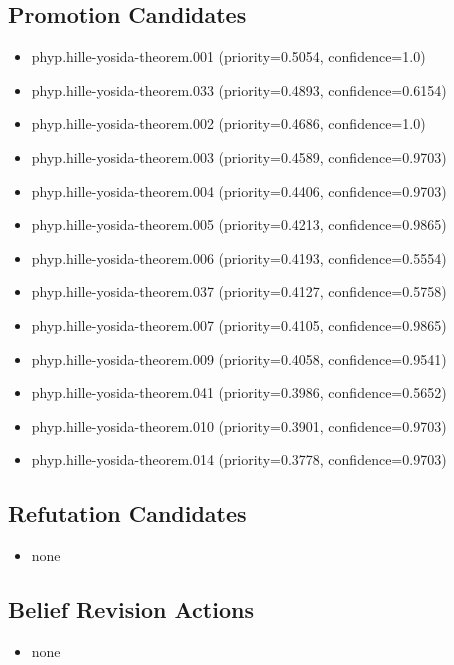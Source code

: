 \documentclass[
]{article}
\newcounter{none} %
\providecommand{\tightlist}{%
  \setlength{\itemsep}{0pt}\setlength{\parskip}{0pt}}
\begin{document}
\subsection{Promotion Candidates}\label{promotion-candidates}

\begin{itemize}
\tightlist
\item
  phyp.hille-yosida-theorem.001 (priority=0.5054, confidence=1.0)
\item
  phyp.hille-yosida-theorem.033 (priority=0.4893, confidence=0.6154)
\item
  phyp.hille-yosida-theorem.002 (priority=0.4686, confidence=1.0)
\item
  phyp.hille-yosida-theorem.003 (priority=0.4589, confidence=0.9703)
\item
  phyp.hille-yosida-theorem.004 (priority=0.4406, confidence=0.9703)
\item
  phyp.hille-yosida-theorem.005 (priority=0.4213, confidence=0.9865)
\item
  phyp.hille-yosida-theorem.006 (priority=0.4193, confidence=0.5554)
\item
  phyp.hille-yosida-theorem.037 (priority=0.4127, confidence=0.5758)
\item
  phyp.hille-yosida-theorem.007 (priority=0.4105, confidence=0.9865)
\item
  phyp.hille-yosida-theorem.009 (priority=0.4058, confidence=0.9541)
\item
  phyp.hille-yosida-theorem.041 (priority=0.3986, confidence=0.5652)
\item
  phyp.hille-yosida-theorem.010 (priority=0.3901, confidence=0.9703)
\item
  phyp.hille-yosida-theorem.014 (priority=0.3778, confidence=0.9703)
\end{itemize}

\subsection{Refutation Candidates}\label{refutation-candidates}

\begin{itemize}
\tightlist
\item
  none
\end{itemize}

\subsection{Belief Revision Actions}\label{belief-revision-actions}

\begin{itemize}
\tightlist
\item
  none
\end{itemize}
\end{document}
